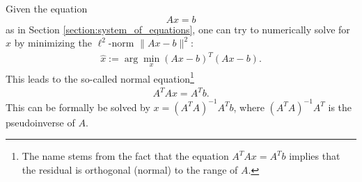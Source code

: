     \begin{method}
        Given the equation \[Ax=b\] as in Section \ref{section:system_of_equations}, one can try to numerically solve for $x$ by minimizing the $\ell^2$-norm $\|Ax-b\|^2$:
        \begin{gather}
            \hat{x}:=\arg\min_x(Ax-b)^T(Ax-b).
        \end{gather}
        This leads to the so-called normal equation\footnote{The name stems from the fact that the equation $A^TAx = A^Tb$ implies that the residual is orthogonal (normal) to the range of $A$.}
        \begin{gather}
            \label{data:normal_equation}
            A^TAx = A^Tb.
        \end{gather}
        This can be formally be solved by $x=(A^TA)^{-1}A^Tb$, where $(A^TA)^{-1}A^T$ is the pseudoinverse of $A$.
    \end{method}

